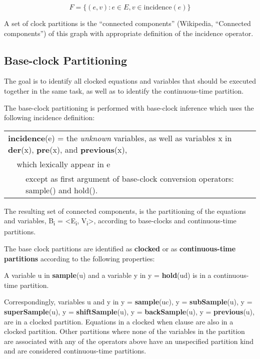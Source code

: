 $$F = \{(e, v) : e \in E , v \in \text{incidence}(e)\}$$

A set of clock partitions is the ``connected components'' (Wikipedia,
``Connected components'') of this graph with appropriate definition of
the incidence operator.

\subsection{Base-clock Partitioning}

The goal is to identify all clocked equations and variables that should
be executed together in the same task, as well as to identify the
continuous-time partition.

The base-clock partitioning is performed with base-clock inference which
uses the following incidence definition:

\begin{tabular}{p{1cm}p{1cm}p{1cm}p{12cm}}
\multicolumn{4}{p{15cm}}{\textbf{incidence}(e) = the \emph{unknown} variables, as well as
variables x in \textbf{der}(x), \textbf{pre}(x), and \textbf{previous}(x),}\\
&\multicolumn{3}{p{14cm}}{which lexically appear in e}\\
&&\multicolumn{2}{p{13cm}}{except as first argument of base-clock conversion operators: sample() and hold().}
\end{tabular}

The resulting set of connected components, is the partitioning of the
equations and variables, B\textsubscript{i} =
\textless{}E\textsubscript{i}, V\textsubscript{i}\textgreater{},
according to base-clocks and continuous-time partitions.

The base clock partitions are identified as \textbf{clocked} or as
\textbf{continuous-time partitions} according to the following
properties:

A variable u in \textbf{sample}(u) and a variable y in y =
\textbf{hold}(ud) is in a continuous-time partition.

Correspondingly, variables u and y in y = \textbf{sample}(uc), y =
\textbf{subSample}(u), y = \textbf{superSample}(u), y =
\textbf{shiftSample}(u), y = \textbf{backSample}(u), y =
\textbf{previous}(u), are in a clocked partition. Equations in a clocked
when clause are also in a clocked partition.
Other partitions where none of the variables in the partition are
associated with any of the operators above have an unspecified partition
kind and are considered continuous-time partitions.

